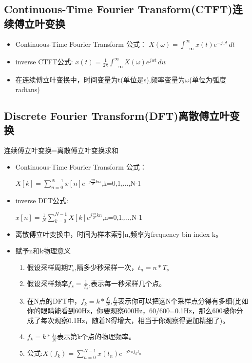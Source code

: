 \documentclass[UTF8]{ctexart}
\begin{document}
\subsection{Continuous-Time Fourier Transform(CTFT)连续傅立叶变换}

\begin{itemize}
    \item Continuous-Time Fourier Transform 公式：
    $X(\omega)=\int_{-\infty }^{\infty} x(t)e^{-j\omega t} \,dt $

    \item inverse CTFT公式:
    $x(t)=\frac{1}{2\pi}\int_{-\infty}^{\infty}X(\omega)e^{jwt} \,dw$

    \item 在连续傅立叶变换中，时间变量为t(单位是s),频率变量为$\omega$(单位为弧度radians)

\end{itemize}

\subsection{Discrete Fourier Transform(DFT)离散傅立叶变换}

连续傅立叶变换=离散傅立叶变换求和

\begin{itemize}
    \item Continuous-Time Fourier Transform 公式：
    
    $X[k]=\sum\limits_{n=0}^{N-1} x[n]e^{-j\frac{2\pi}{N}kn}$,k=0,1,...,N-1

    \item inverse DFT公式:
    
    $x[n]=\frac{1}{N}\sum_{k=0}^{N-1}X[k]e^{j\frac{2\pi}{N}kn}$,n=0,1,...,N-1

    \item 离散傅立叶变换中，时间为样本索引n,频率为frequency bin index k。
    
    \item 赋予n和k物理意义
    \begin{enumerate}
        \item 假设采样周期$T_{s}$,隔多少秒采样一次，$t_{n}=n*T_{s}$
        \item 假设采样频率$f_{s}=\frac{1}{T_{s}}$,表示每一秒采样几个点。
        \item 在N点的DFT中，$f_k=k*\frac{f_{s}}{N}$,$\frac{f_{s}}{N}$表示你可以把这N个采样点分得有多细(比如你的眼睛能看到60Hz，你要观察600Hz，60/600=0.1Hz，那么600被你分成了每次观察0.1Hz，随着N得增大，相当于你观察得更加精细了)。
        \item $f_k=k*\frac{f_{s}}{N}$表示第k个点的物理频率。
        \item 公式:$X(f_{k})=\sum\limits^{N-1}_{n=0}x(t_{n})e^{-j2\pi f_{k}t_{n}}$
    \end{enumerate}

\end{itemize}
\end{document}

